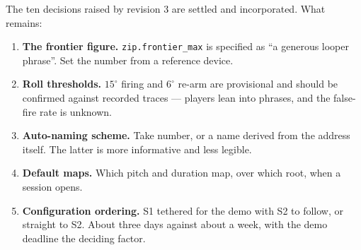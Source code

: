 \documentclass[11pt,a4paper]{article}
\theoremstyle{definition}
\theoremstyle{plain}
\theoremstyle{remark}
\begin{document}
The ten decisions raised by revision 3 are settled and incorporated. What remains:

\begin{enumerate}[leftmargin=*,itemsep=0.4em]
\item \textbf{The frontier figure.} \texttt{zip.frontier\_max} is specified as ``a generous looper
      phrase''. Set the number from a reference device.
\item \textbf{Roll thresholds.} $15^\circ$ firing and $6^\circ$ re-arm are provisional and should be
      confirmed against recorded traces --- players lean into phrases, and the false-fire rate is
      unknown.
\item \textbf{Auto-naming scheme.} Take number, or a name derived from the address itself. The
      latter is more informative and less legible.
\item \textbf{Default maps.} Which pitch and duration map, over which root, when a session opens.
\item \textbf{Configuration ordering.} S1 tethered for the demo with S2 to follow, or straight to
      S2. About three days against about a week, with the demo deadline the deciding factor.
\end{enumerate}
\end{document}
